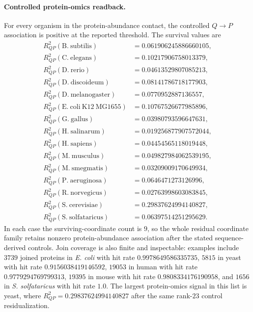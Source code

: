 \paragraph{Controlled protein-omics readback.}
For every organism in the protein-abundance contact, the controlled $Q\to P$ association is positive at the reported threshold.  The survival values are
$$
\begin{aligned}
R^2_{QP}(\mathrm{B.\ subtilis}) &= 0.061906245886660105,\\
R^2_{QP}(\mathrm{C.\ elegans}) &= 0.10217906758013379,\\
R^2_{QP}(\mathrm{D.\ rerio}) &= 0.04613529807085213,\\
R^2_{QP}(\mathrm{D.\ discoideum}) &= 0.08141786718177903,\\
R^2_{QP}(\mathrm{D.\ melanogaster}) &= 0.0770952887136557,\\
R^2_{QP}(\mathrm{E.\ coli\ K12\ MG1655}) &= 0.10767526677985896,\\
R^2_{QP}(\mathrm{G.\ gallus}) &= 0.03980793596647631,\\
R^2_{QP}(\mathrm{H.\ salinarum}) &= 0.019256877907572044,\\
R^2_{QP}(\mathrm{H.\ sapiens}) &= 0.04454565118019448,\\
R^2_{QP}(\mathrm{M.\ musculus}) &= 0.049827984062539195,\\
R^2_{QP}(\mathrm{M.\ smegmatis}) &= 0.03209009170649934,\\
R^2_{QP}(\mathrm{P.\ aeruginosa}) &= 0.0646471273126996,\\
R^2_{QP}(\mathrm{R.\ norvegicus}) &= 0.02763998603083845,\\
R^2_{QP}(\mathrm{S.\ cerevisiae}) &= 0.29837624994140827,\\
R^2_{QP}(\mathrm{S.\ solfataricus}) &= 0.06397514251295629.
\end{aligned}
$$
In each case the surviving-coordinate count is $9$, so the whole residual coordinate family retains nonzero protein-abundance association after the stated sequence-derived controls.  Join coverage is also finite and inspectable: examples include $3739$ joined proteins in \emph{E. coli} with hit rate $0.9978649586335735$, $5815$ in yeast with hit rate $0.9156038419146592$, $19053$ in human with hit rate $0.9779294769799313$, $19395$ in mouse with hit rate $0.9808334176190958$, and $1656$ in \emph{S. solfataricus} with hit rate $1.0$.  The largest protein-omics signal in this list is yeast, where $R^2_{QP}=0.29837624994140827$ after the same rank-$23$ control residualization.

